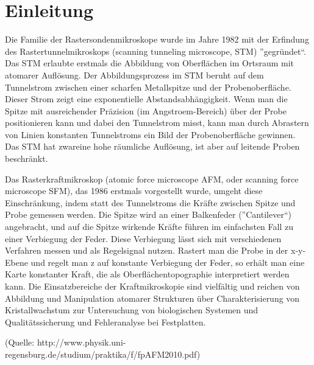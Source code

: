 \chapter{Einleitung}

Die Familie der Rastersondenmikroskope wurde im Jahre 1982 mit der Erfindung des Rastertunnelmikroskops (scanning tunneling microscope, STM) ”gegründet“.
Das STM erlaubte erstmals die Abbildung von Oberflächen im Ortsraum mit atomarer Auflösung.
Der Abbildungsprozess im STM beruht auf dem Tunnelstrom zwischen einer scharfen Metallspitze und der Probenoberfläche. 
Dieser Strom zeigt eine exponentielle Abstandsabhängigkeit. 
Wenn man die Spitze mit ausreichender Präzision (im Angstroem-Bereich) über der Probe positionieren kann und dabei den Tunnelstrom misst, kann man durch Abrastern von Linien konstanten Tunnelstroms ein Bild der Probenoberfläche gewinnen. 
Das STM hat zwareine hohe räumliche Auflösung, ist aber auf leitende Proben beschränkt.

Das Rasterkraftmikroskop (atomic force microscope AFM, oder scanning force microscope SFM), das 1986 erstmals vorgestellt wurde, umgeht diese Einschränkung, indem statt des Tunnelstroms die Kräfte zwischen Spitze und Probe gemessen werden. 
Die Spitze wird an einer Balkenfeder (”Cantilever“) angebracht, und auf die Spitze wirkende Kräfte führen im einfachsten Fall zu einer Verbiegung der Feder. Diese Verbiegung lässt sich mit verschiedenen  Verfahren  messen  und  als  Regelsignal  nutzen.
Rastert  man  die  Probe in  der x-y-Ebene  und  regelt  man z auf  konstante  Verbiegung  der  Feder, so erhält man eine Karte konstanter Kraft, die als Oberflächentopographie interpretiert werden kann.
Die Einsatzbereiche der Kraftmikroskopie sind vielfältig und reichen von Abbildung  und  Manipulation  atomarer  Strukturen über  Charakterisierung von Kristallwachstum zur Untersuchung von biologischen Systemen und Qualitätssicherung und Fehleranalyse bei Festplatten.

(Quelle: http://www.physik.uni-regensburg.de/studium/praktika/f/fpAFM2010.pdf)
